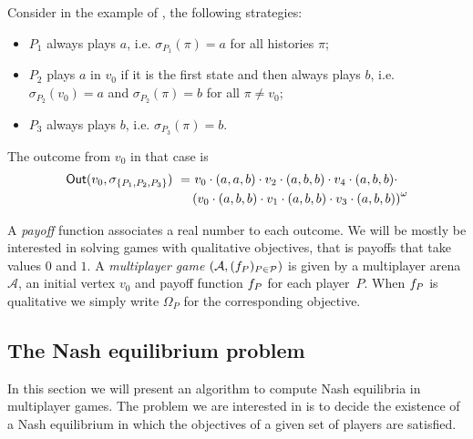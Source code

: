 \begin{example}
  Consider in the example of , the following
  strategies:
  \begin{itemize}
  \item $P_1$ always plays $a$, i.e. $\sigma_{P_1}(\pi) = a$ for all histories $\pi$;
  \item $P_2$ plays $a$ in $v_0$ if it is the first state and then always plays $b$, i.e. $\sigma_{P_2}(v_0) = a$ and $\sigma_{P_2}(\pi) = b$ for all $\pi \ne v_0$;
  \item $P_3$ always plays $b$, i.e. $\sigma_{P_3}(\pi) = b$.
  \end{itemize}
  The outcome from $v_0$ in that case is
  \begin{align*}
    \textsf{Out}(v_0, \sigma_{\{P_1, P_2, P_3\}}) ~ = & ~ v_0 \cdot (a, a, b) \cdot v_2 \cdot (a, b, b)
                                                \cdot v_4 \cdot (a, b, b) \cdot\\
                                              & \left(v_0 \cdot (a, b, b)
                                                \cdot v_1 \cdot (a, b, b)
                                                \cdot v_3 \cdot (a, b, b)\right)^\omega
  \end{align*}
\end{example}


\begin{definition}
  A \emph{payoff} function associates a real number to each outcome.
  We will be mostly be interested in solving games with qualitative
  objectives, that is payoffs that take values $0$ and $1$.
  A \emph{multiplayer game} \((\mathcal{A}, (f_P)_{P \in \mathcal{P}})\) is given by a multiplayer arena $\mathcal{A}$, an initial
  vertex $v_0$ and payoff function $f_P$ for each player~$P$.
  When $f_P$ is qualitative we simply write $\Omega_P$
  for the corresponding objective.
\end{definition}


\subsection{The Nash equilibrium problem}
\label{13-subsec:algorithm-for-finding-nash-equilibria}

In this section we will present an algorithm to compute
Nash equilibria in
multiplayer games.
The problem we are interested in is to decide the existence of a Nash
equilibrium in which the objectives of a given set of players are
satisfied.

